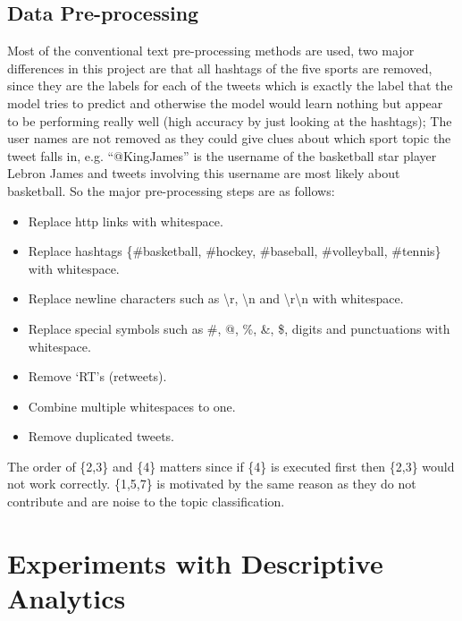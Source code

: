 \documentclass[journal, a4paper]{IEEEtran}
\begin{document}
\subsection{Data Pre-processing}
Most of the conventional text pre-processing methods are used, two major differences in this project are that all hashtags of the five sports are removed, since they are the labels for each of the tweets which is exactly the label that the model tries to predict and otherwise the model would learn nothing but appear to be performing really well (high accuracy by just looking at the hashtags); The user names are not removed as they could give clues about which sport topic the tweet falls in, e.g. ``@KingJames'' is the username of the basketball star player Lebron James and tweets involving this username are most likely about basketball. So the major pre-processing steps are as follows:
\begin{itemize}
\item Replace http links with whitespace.
\item Replace hashtags \{\#basketball, \#hockey, \#baseball, \#volleyball, \#tennis\} with whitespace.
\item Replace newline characters such as \textbackslash r, \textbackslash n and \textbackslash r\textbackslash n with whitespace.
\item Replace special symbols such as \#, @, \%, \&, \$, digits and punctuations with whitespace.
\item Remove `RT's (retweets).
\item Combine multiple whitespaces to one.
\item Remove duplicated tweets.
\end{itemize}
The order of \{2,3\} and \{4\} matters since if \{4\} is executed first then \{2,3\} would not work correctly. \{1,5,7\} is motivated by the same reason as they do not contribute and are noise to the topic classification.
\section{Experiments with Descriptive Analytics}
\end{document}
